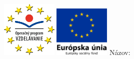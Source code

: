 \documentclass[12pt]{extarticle}
\begin{document}
	\includegraphics[width=0.2\textwidth]{operacny-program-vzdelavanie-logo}
	\hfill
	\includegraphics[width=0.2\textwidth]{eu-socialny-fond-logo}
	Názov: \begin{center}\end{center}
\end{document}
